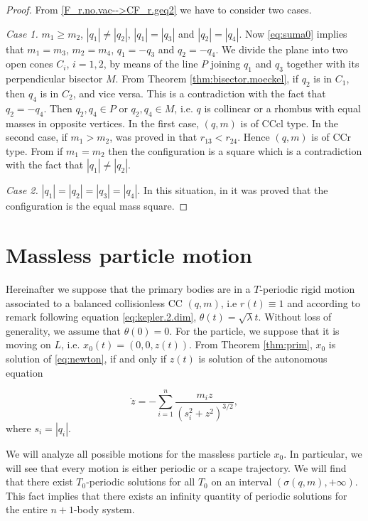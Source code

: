 \documentclass[smallcondensed]{svjour3}
\begin{document}
\begin{proof}
From \eqref{F_r.no.vac-->CF_r.geq2} we have to consider two cases.

\emph{Case 1.}  $m_1\geq m_2$, $|q_1|\neq|q_2|$, $|q_1|=|q_3|$ and $|q_2|=|q_4|$. Now \eqref{eq:suma0} implies that
 $m_1=m_3$, $m_2=m_4$, $q_1=-q_3$ and $q_2=-q_4$.  We divide the plane into two open cones $C_i$, $i=1,2$, by means of  the line $P$ joining $q_1$  and $q_3$ together with its perpendicular bisector $M$.  From Theorem \ref{thm:bisector.moeckel}, if  $q_2$  is in $C_1$, then  $q_4$ is in $C_2$, and vice versa. This is a contradiction with the fact that $q_2=-q_4$. Then $q_2,q_4\in P$ or $q_2,q_4\in M$, i.e. $q$ is collinear or a rhombus with equal masses in opposite vertices. In the first case, $(q,m)$ is of  CCcl type. In the second case, if $m_1>m_2$,   was proved in \cite[Eqs. $(3.44)$ and $(3.45)$]{long2002four} that $r_{13}<r_{24}$. Hence $(q,m)$ is of  CCr type. From \cite[Corollary 2]{perez2007convex} if $m_1=m_2$ then the configuration is a square which is a contradiction with the fact that $|q_1|\neq|q_2|$.

\emph{Case 2.} $|q_1|=|q_2|=|q_3|=|q_4|$. In this situation,   in \cite{hampton2005co} it was proved that the configuration is the equal mass square.
\end{proof}

\section{Massless particle motion}\label{sec:mas-mot}
Hereinafter  we suppose that the primary bodies are in a $T$-periodic rigid motion associated to a balanced collisionless CC $(q,m)$, i.e  $r(t)\equiv 1$ and according to remark following equation \eqref{eq:kepler.2.dim}, $\theta (t)=\sqrt{\lambda}t$. Without loss of generality,  we  assume that $\theta(0)=0$. For the particle, we suppose that it is moving on $L$, i.e. $x_0(t)=(0,0,z(t))$. From Theorem \ref{thm:prim}, $x_0$ is solution of \eqref{eq:newton}, if and only if $z(t)$ is solution of the autonomous equation


\begin{equation}\label{eq:eq_new_red}
 \ddot{z}=-\sum_{i=1}^n\frac{m_iz}{(s_i^2+z^2)^{3/2}},
\end{equation}
where $s_i=|q_i|$.

We will analyze all possible motions for the massless particle $x_0$. In particular, we will see that every motion is either periodic or a scape trajectory. We will find that there exist $T_0$-periodic solutions for all $T_0$ on an interval  $(\sigma(q,m),+\infty)$. This fact implies that there exists an infinity quantity of periodic solutions for the entire $n+1$-body system.
\end{document}

